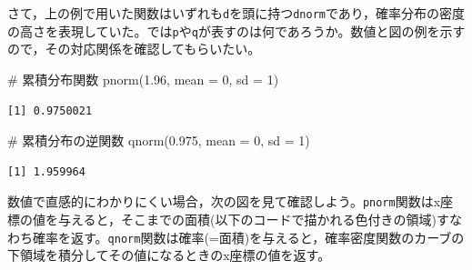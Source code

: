 \documentclass[
  a4paper,
]{ltjsbook}
\newenvironment{Shaded}{\begin{snugshade}}{\end{snugshade}}
\newcommand{\AttributeTok}[1]{\textcolor[rgb]{0.40,0.45,0.13}{#1}}
\newcommand{\CommentTok}[1]{\textcolor[rgb]{0.37,0.37,0.37}{#1}}
\newcommand{\DecValTok}[1]{\textcolor[rgb]{0.68,0.00,0.00}{#1}}
\newcommand{\FloatTok}[1]{\textcolor[rgb]{0.68,0.00,0.00}{#1}}
\newcommand{\FunctionTok}[1]{\textcolor[rgb]{0.28,0.35,0.67}{#1}}
\newcommand{\NormalTok}[1]{\textcolor[rgb]{0.00,0.23,0.31}{#1}}
\begin{document}
さて，上の例で用いた関数はいずれも\texttt{d}を頭に持つ\texttt{dnorm}であり，確率分布の密度の高さを表現していた。では\texttt{p}や\texttt{q}が表すのは何であろうか。数値と図の例を示すので，その対応関係を確認してもらいたい。

\begin{Shaded}
\begin{Highlighting}[]
\CommentTok{\# 累積分布関数}
\FunctionTok{pnorm}\NormalTok{(}\FloatTok{1.96}\NormalTok{, }\AttributeTok{mean =} \DecValTok{0}\NormalTok{, }\AttributeTok{sd =} \DecValTok{1}\NormalTok{)}
\end{Highlighting}
\end{Shaded}

\begin{verbatim}
[1] 0.9750021
\end{verbatim}

\begin{Shaded}
\begin{Highlighting}[]
\CommentTok{\# 累積分布の逆関数}
\FunctionTok{qnorm}\NormalTok{(}\FloatTok{0.975}\NormalTok{, }\AttributeTok{mean =} \DecValTok{0}\NormalTok{, }\AttributeTok{sd =} \DecValTok{1}\NormalTok{)}
\end{Highlighting}
\end{Shaded}

\begin{verbatim}
[1] 1.959964
\end{verbatim}

数値で直感的にわかりにくい場合，次の図を見て確認しよう。\texttt{pnorm}関数はx座標の値を与えると，そこまでの面積(以下のコードで描かれる色付きの領域)すなわち確率を返す。\texttt{qnorm}関数は確率(=面積)を与えると，確率密度関数のカーブの下領域を積分してその値になるときのx座標の値を返す。
\end{document}
